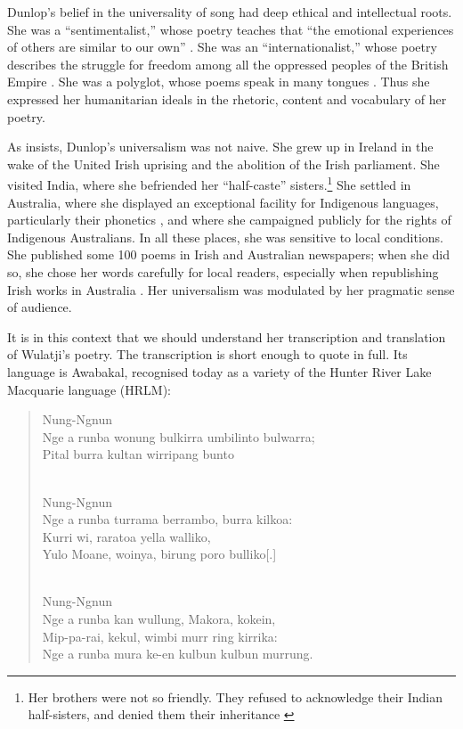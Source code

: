 \documentclass[
  Crown,
  times,
  sageh]{sagej}
\begin{document}
Dunlop's belief in the universality of song had deep ethical and
intellectual roots. She was a ``sentimentalist,'' whose poetry teaches
that ``the emotional experiences of others are similar to our own''
\citep[91]{rudy_beyond_2021}. She was an ``internationalist,'' whose
poetry describes the struggle for freedom among all the oppressed
peoples of the British Empire
\citetext{\citealp[60]{wu_morning_2021}; \citealp[9]{johnston_proud_2021}}.
She was a polyglot, whose poems speak in many tongues
\citep[158-159]{wafer_unmapping_2021}. Thus she expressed her
humanitarian ideals in the rhetoric, content and vocabulary of her
poetry.

As \citet{rudy_beyond_2021} insists, Dunlop's universalism was not
naive. She grew up in Ireland in the wake of the United Irish uprising
and the abolition of the Irish parliament. She visited India, where she
befriended her ``half-caste'' sisters.\footnote{Her brothers were not so
  friendly. They refused to acknowledge their Indian half-sisters, and
  denied them their inheritance
  \citetext{\citealp[39]{johnston_poetry_2021}; \citealp[63]{wu_morning_2021}}}
She settled in Australia, where she displayed an exceptional facility
for Indigenous languages, particularly their phonetics
\citep[46]{johnston_poetry_2021}, and where she campaigned publicly for
the rights of Indigenous Australians. In all these places, she was
sensitive to local conditions. She published some 100 poems in Irish and
Australian newspapers; when she did so, she chose her words carefully
for local readers, especially when republishing Irish works in Australia
\citep[94]{rudy_beyond_2021}. Her universalism was modulated by her
pragmatic sense of audience.

It is in this context that we should understand her transcription and
translation of Wulatji's poetry. The transcription is short enough to
quote in full. Its language is Awabakal, recognised today as a variety
of the Hunter River Lake Macquarie language (HRLM):

\begin{quote}
Nung-Ngnun\\
Nge a runba wonung bulkirra umbilinto bulwarra;\\
Pital burra kultan wirripang bunto\\
\strut \\
Nung-Ngnun\\
Nge a runba turrama berrambo, burra kilkoa:\\
Kurri wi, raratoa yella walliko,\\
Yulo Moane, woinya, birung poro bulliko{[}.{]}\\
\strut \\
Nung-Ngnun\\
Nge a runba kan wullung, Makora, kokein,\\
Mip-pa-rai, kekul, wimbi murr ring kirrika:\\
Nge a runba mura ke-en kulbun kulbun murrung.
\citep{wulatji_native_1848}
\end{quote}
\end{document}
